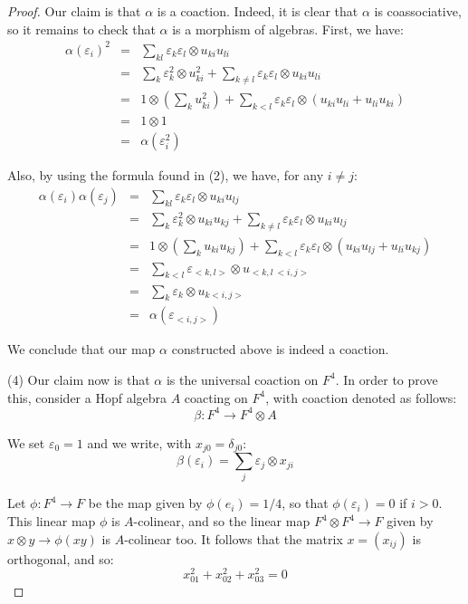 \documentclass[12pt]{amsbook}
\begin{document}
\begin{proof}
Our claim is that $\alpha$ is a coaction. Indeed, it is clear that $\alpha$ is coassociative, so it remains to check that $\alpha$ is a morphism of algebras. First, we have:
\begin{eqnarray*}
\alpha(\varepsilon_i)^2
&=&\sum_{kl}\varepsilon_k\varepsilon_l\otimes u_{ki}u_{li}\\
&=&\sum_k\varepsilon_k^2\otimes u_{ki}^2+\sum_{k\neq l}\varepsilon_k\varepsilon_l\otimes u_{ki}u_{li}\\
&=&1\otimes\left(\sum_ku_{ki}^2\right)+\sum_{k<l}\varepsilon_k\varepsilon_l\otimes(u_{ki}u_{li} +u_{li}u_{ki})\\
&=&1\otimes 1\\
&=&\alpha(\varepsilon_i^2)
\end{eqnarray*}

Also, by using the formula found in (2), we have, for any $i\neq j$:
\begin{eqnarray*}
\alpha(\varepsilon_i)\alpha(\varepsilon_j)
&=&\sum_{kl}\varepsilon_k\varepsilon_l\otimes u_{ki}u_{lj}\\
&=&\sum_k\varepsilon_k^2\otimes u_{ki}u_{kj}+\sum_{k\neq l}\varepsilon_k\varepsilon_l\otimes
 u_{ki}u_{lj}\\
&=&1\otimes\left(\sum_ku_{ki}u_{kj}\right)+\sum_{k<l}\varepsilon_k\varepsilon_l\otimes(u_{ki}u_{lj}+u_{li}u_{kj})\\
&=&\sum_{k<l}\varepsilon_{<k,l>}\otimes u_{<k,l\><i,j>}\\
&=&\sum_k\varepsilon_k\otimes u_{k< i,j>}\\
&=&\alpha(\varepsilon_{<i,j>})
\end{eqnarray*}

We conclude that our map $\alpha$ constructed above is indeed a coaction.

\medskip

(4) Our claim now is that $\alpha$ is the universal coaction on $F^4$. In order to prove this, consider a Hopf algebra $A$ coacting on $F^4$, with coaction denoted as follows:
$$\beta :F^4 \to F^4 \otimes A$$

We set $\varepsilon_0 =1$ and we write, with $x_{j0}=\delta_{j0}$: 
$$\beta(\varepsilon_i)=\sum_j\varepsilon_j\otimes x_{ji}$$

Let $\phi :F^4 \to F$ be the map given by $\phi(e_i) =1/4$, so that $\phi(\varepsilon_i)=0$ if $i>0$. This linear map $\phi$ is $A$-colinear, and so the linear map $F^4 \otimes F^4 \to F$ given by $x\otimes y\to\phi(xy)$ is $A$-colinear too. It follows that the matrix $x = (x_{ij})$ is orthogonal, and so:
$$x_{01}^2+x_{02}^2 + x_{03}^2=0$$


\end{proof}
\end{document}
